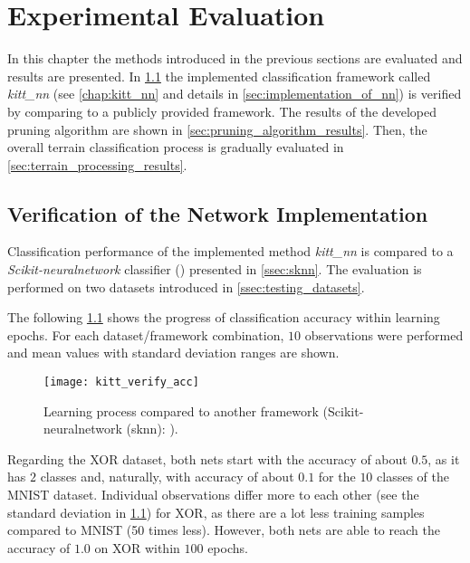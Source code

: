 \chapter{Experimental Evaluation} \label{chap:results}
In this chapter the methods introduced in the previous sections are evaluated and results are presented. In \cref{sec:verification_of_nn} the implemented classification framework called \textit{kitt\_nn} (see \cref{chap:kitt_nn} and details in \cref{sec:implementation_of_nn}) is verified by comparing to a publicly provided framework. The results of the developed pruning algorithm are shown in \cref{sec:pruning_algorithm_results}. Then, the overall terrain classification process is gradually evaluated in \cref{sec:terrain_processing_results}.

\section{Verification of the Network Implementation} \label{sec:verification_of_nn}
Classification performance of the implemented method \textit{kitt\_nn} is compared to a \textit{Scikit-neuralnetwork} classifier (\citep{misc:sknn}) presented in \cref{ssec:sknn}. The evaluation is performed on two datasets introduced in \cref{ssec:testing_datasets}.

The following \cref{fig:kitt_verify_acc} shows the progress of classification accuracy within learning epochs. For each dataset/framework combination, $ 10 $ observations were performed and mean values with standard deviation ranges are shown.

\begin{figure}[H]
  \centering
  \texttt{[image: kitt\_verify\_acc]}
  \caption{Learning process compared to another framework (Scikit-neuralnetwork (sknn): \citep{misc:sknn}).}
  \label{fig:kitt_verify_acc}
\end{figure}

Regarding the XOR dataset, both nets start with the accuracy of about $ 0.5 $, as it has $ 2 $ classes and, naturally, with accuracy of about $ 0.1 $ for the $ 10 $ classes of the MNIST dataset. Individual observations differ more to each other (see the standard deviation in \cref{fig:kitt_verify_acc}) for XOR, as there are a lot less training samples compared to MNIST (50 times less). However, both nets are able to reach the accuracy of $ 1.0 $ on XOR within $ 100 $ epochs.


